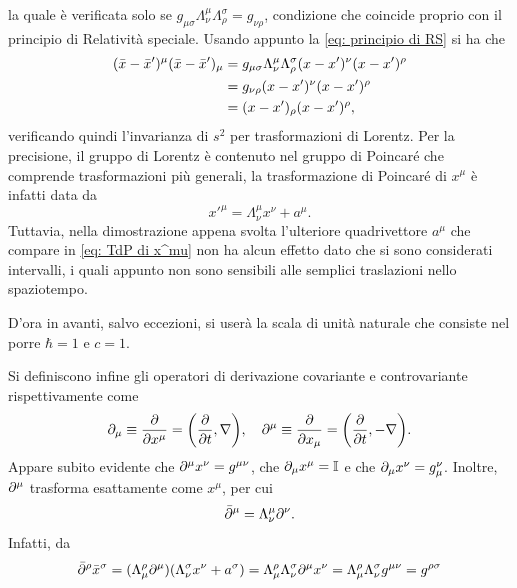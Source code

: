 la quale è verificata solo se $g_{\mu\sigma}\Lambda_\nu^\mu\Lambda^\sigma_\rho=g_{\nu\rho}$, condizione che coincide proprio con il principio di Relatività speciale. Usando appunto la \eqref{eq: principio di RS} si ha che
\begin{equation}
    \begin{split}
        (\bar{x}-\bar{x}')^\mu(\bar{x}-\bar{x}')_\mu &= g_{\mu\sigma}\Lambda_\nu^\mu\Lambda^\sigma_\rho(x-x')^\nu(x-x')^\rho \\
        &= g_{\nu\rho}(x-x')^\nu(x-x')^\rho \\
        &= (x-x')_\rho(x-x')^\rho,
    \end{split}
\end{equation}
verificando quindi l'invarianza di $s^2$ per trasformazioni di Lorentz. Per la precisione, il gruppo di Lorentz è contenuto nel gruppo di Poincaré che comprende trasformazioni più generali, la trasformazione di Poincaré di $x^\mu$ è infatti data da
\begin{equation}
\label{eq: TdP di x^mu}
    x'^\mu  =\Lambda^\mu_\nu x^\nu + a^\mu.
\end{equation}
Tuttavia, nella dimostrazione appena svolta l'ulteriore quadrivettore $a^\mu$ che compare in \eqref{eq: TdP di x^mu} non ha alcun effetto dato che si sono considerati intervalli, i quali appunto non sono sensibili alle semplici traslazioni nello spaziotempo. 
\begin{notz}
    D'ora in avanti, salvo eccezioni, si userà la scala di unità naturale che consiste nel porre $\hbar = 1$ e $c = 1$.
\end{notz}
Si definiscono infine gli operatori di derivazione covariante e controvariante rispettivamente come
\begin{equation}
    \partial_\mu \equiv \frac{\partial}{\partial x^\mu} = \bigg(\frac{\partial}{\partial t},\nabla\bigg),\quad \partial^\mu \equiv \frac{\partial}{\partial x_\mu} = \bigg(\frac{\partial}{\partial t},-\nabla\bigg).
\end{equation}
Appare subito evidente che $\partial^\mu x^\nu = g^{\mu\nu}$, che $\partial_\mu x^\mu = \mathbb{I}$ e che $\partial_\mu x^\nu = g_\mu^\nu$. Inoltre, $\partial^\mu$ trasforma esattamente come $x^\mu$, per cui
\begin{equation}
\label{eq: TdL di d^mu}
    \bar{\partial}^\mu = \Lambda^\mu_\nu\partial^\nu.
\end{equation}
Infatti, da
\begin{equation}
    \bar{\partial}^\rho\bar{x}^\sigma = (\Lambda^\rho_\mu\partial^\mu)(\Lambda^\sigma_\nu x^\nu + a^\sigma) = \Lambda^\rho_\mu\Lambda^\sigma_\nu\partial^\mu x^\nu = \Lambda^\rho_\mu\Lambda^\sigma_\nu g^{\mu\nu} = g^{\rho\sigma}
\end{equation}
